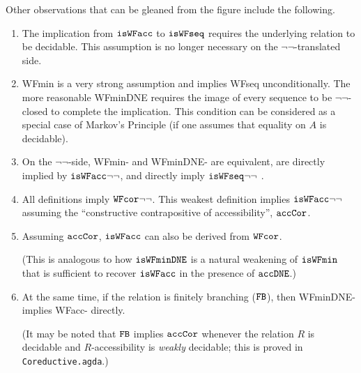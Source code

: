 Other observations that can be gleaned from the figure include the following.
\begin{enumerate}
  \item The implication from $\mathtt{isWFacc}$ to $\mathtt{isWFseq}$ requires the underlying relation to be decidable. 
    This assumption is no longer necessary on the $\lnot\lnot$-translated side.
  \item WFmin is a very strong assumption and implies WFseq unconditionally.
  The more reasonable WFminDNE requires the image of every sequence to be $\lnot\lnot$-closed 
  to complete the implication.  This condition can be considered as a special case of Markov's Principle
  (if one assumes that equality on $A$ is decidable).
  \item On the $\lnot\lnot$-side, WFmin- and WFminDNE- are equivalent, are directly implied by $\mathtt{isWFacc}{\lnot\lnot}$, 
    and directly imply $\mathtt{isWFseq}{\lnot\lnot}$  .
  \item All definitions imply $\mathtt{WFcor}{\lnot\lnot}$.  This weakest definition implies $\mathtt{isWFacc}{\lnot\lnot}$ assuming the 
    ``constructive contrapositive of accessibility'', $\mathtt{accCor}$.
  \item Assuming $\mathtt{accCor}$, $\mathtt{isWFacc}$ can also be derived from $\mathtt{WFcor}$. %

    (This is analogous to how $\mathtt{isWFminDNE}$ is a natural weakening of 
    $\mathtt{isWFmin}$ that is sufficient to recover $\mathtt{isWFacc}$ in the presence of {$\mathtt{accDNE}$}.)

  \item At the same time, if the relation is finitely branching ($\mathtt{FB}$), then WFminDNE-
    implies WFacc- directly.

    (It may be noted that $\mathtt{FB}$ implies $\mathtt{accCor}$ whenever the relation $R$ is decidable
    and $R$-accessibility is \emph{weakly} decidable;  this is proved in \texttt{Coreductive.agda}.)


\end{enumerate}
